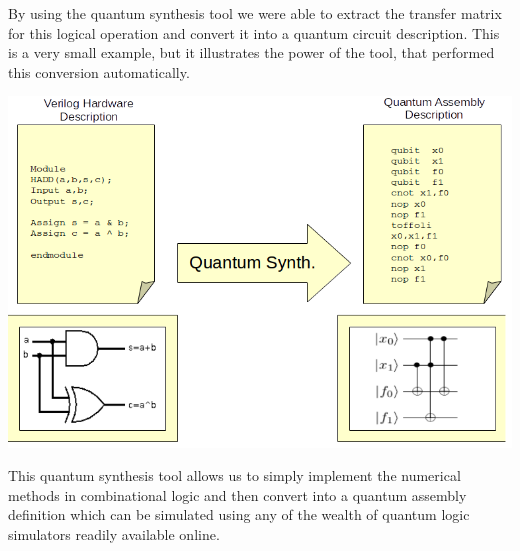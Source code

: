 By using the quantum synthesis tool we were able to extract the transfer matrix for this logical operation and convert it into a quantum circuit description. This is a very small example, but it illustrates the power of the tool, that performed this conversion automatically.
\begin{center}
\includegraphics[scale=0.4]{QuantumSynthesis.png}
\end{center}

This quantum synthesis tool allows us to simply implement the numerical methods in combinational logic and then convert into a quantum assembly definition which can be simulated using any of the wealth of quantum logic simulators readily available online.